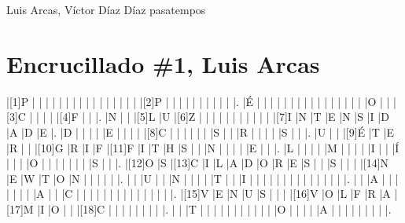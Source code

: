 \Titular*%
{Pasatempos}%
{Luis Arcas, Víctor Díaz Díaz}%
{pasatempos}%
{}%
\vspace*{-6mm}
\section*{\textcolor{Resalte}{Encrucillado \#1}, Luis Arcas}

\begin{Puzzle}{27}{16}
|[1]P  |{}    |{}    |{}    |{}    |{}    |{}    |{}    |{}    |{}    |{}    |{}    |{}    |{}    |{}    |{}    |{}    |[2]P  |{}    |{}    |{}    |{}    |{}    |{}    |{}    |{}    |{}   |{} |.
|É     |{}    |{}    |{}    |{}    |{}    |{}    |{}    |{}    |{}    |{}    |{}    |{}    |{}    |{}    |{}    |{}    |O     |{}    |{}    |[3]C  |{}    |{}    |{}    |{}    |[4]F  |{}   |{} |.
|N     |{}    |{}    |[5]L  |U     |[6]Z  |{}    |{}    |{}    |{}    |{}    |{}    |{}    |{}    |{}    |{}    |{}    |[7]I  |N     |T     |E     |N     |S     |I     |D     |A     |D    |E  |.
|D     |{}    |{}    |{}    |{}    |E     |{}    |{}    |{}    |{}    |[8]C  |{}    |{}    |{}    |{}    |{}    |{}    |S     |{}    |{}    |R     |{}    |{}    |{}    |{}    |S     |{}   |{} |.
|U     |{}    |{}    |[9]É  |T     |E     |R     |{}    |{}    |[10]G |R     |I     |F     |[11]F |I     |T     |H     |S     |{}    |{}    |N     |{}    |{}    |{}    |{}    |E     |{}   |{} |.
|L     |{}    |{}    |{}    |{}    |M     |{}    |{}    |{}    |{}    |I     |{}    |{}    |Í     |{}    |{}    |{}    |O     |{}    |{}    |{}    |{}    |{}    |{}    |{}    |S     |{}   |{} |.
|[12]O |S     |[13]C |I     |L     |A     |D     |O     |R     |E     |S     |{}    |{}    |S     |{}    |{}    |{}    |[14]N |E     |W     |T     |O     |N     |{}    |{}    |{}    |{}   |{} |.
|{}    |{}    |U     |{}    |{}    |N     |{}    |{}    |{}    |{}    |T     |{}    |{}    |I     |{}    |{}    |{}    |{}    |{}    |{}    |{}    |{}    |{}    |{}    |{}    |{}    |{}   |{} |.
|{}    |{}    |A     |{}    |{}    |{}    |{}    |{}    |{}    |{}    |A     |{}    |{}    |C     |{}    |{}    |{}    |{}    |{}    |{}    |{}    |{}    |{}    |{}    |{}    |{}    |{}   |{} |.
|[15]V |E     |N     |U     |S     |{}    |{}    |{}    |[16]V |O     |L     |F     |R     |A     |[17]M |I     |O     |{}    |{}    |[18]C |{}    |{}    |{}    |{}    |{}    |{}    |{}   |{} |.
|{}    |{}    |T     |{}    |{}    |{}    |{}    |{}    |{}    |{}    |{}    |{}    |{}    |{}    |O     |{}    |{}    |{}    |{}    |A     |{}    |{}    |{}    |{}    |{}    |{}    |{}   |{} |.

\end{Puzzle}

